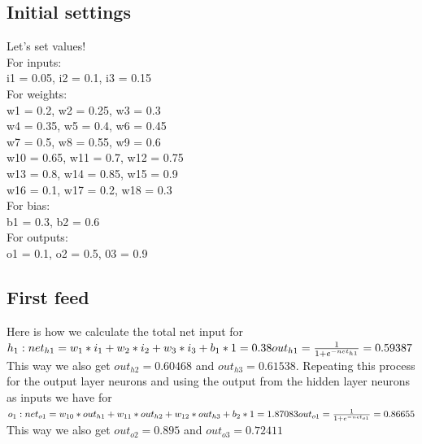 \documentclass[12pt]{article}
\begin{document}
\subsection{Initial settings}
Let's set values!\\
For inputs:\\
i1 = 0.05, i2 = 0.1, i3 = 0.15\\
For weights:\\
w1 = 0.2, w2 = 0.25, w3 = 0.3\\
w4 = 0.35, w5 = 0.4, w6 = 0.45\\
w7 = 0.5, w8 = 0.55, w9 = 0.6\\
w10 = 0.65, w11 = 0.7, w12 = 0.75\\
w13 = 0.8, w14 = 0.85, w15 = 0.9\\
w16 = 0.1, w17 = 0.2, w18 = 0.3\\
For bias:\\
b1 = 0.3, b2 = 0.6\\
For outputs:\\
o1 = 0.1, o2 = 0.5, 03 = 0.9
\subsection{First feed}
Here is how we calculate the total net input for 
\begin{math}
h_1:\newline\newline
net_{h1} = w_1 * i_1 + w_2 * i_2 + w_3 * i_3 + b_1 * 1 = 0.38\newline\newline
out_{h1} = \frac{1}{1 + e^{- net_{h1}}} = 0.59387\newline\newline
\end{math}
This way we also get 
\begin{math}out_{h2} = 0.60468 \end{math} 
and 
\begin{math}out_{h3} = 0.61538\end{math}.
Repeating this process for the output layer neurons and using the output from the hidden layer neurons as inputs we have for
\begin{math}
o_{1}:\newline\newline
net_{o1} = w_{10} * out_{h1} + w_{11} * out_{h2} + w_{12} * out_{h3} + b_2 * 1 = 1.87083 \newline\newline
out_{o1} = \frac{1}{1 + e^{- net_{o1}}} = 0.86655\newline\newline
\end{math}
This way we also get 
\begin{math}out_{o2} = 0.895\end{math} 
and 
\begin{math}out_{o3} = 0.72411\end{math} 
\end{document}
